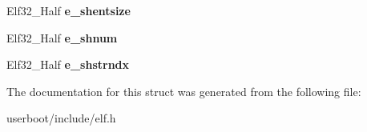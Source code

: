 \begin{DoxyCompactItemize}
\item 
Elf32\+\_\+\+Half {\bfseries e\+\_\+shentsize}\hypertarget{structElf32__Ehdr_ab53c709a841960e499da68e2316ed428}{}\label{structElf32__Ehdr_ab53c709a841960e499da68e2316ed428}

\item 
Elf32\+\_\+\+Half {\bfseries e\+\_\+shnum}\hypertarget{structElf32__Ehdr_a11249bd7e61642742a68a3e7f69ac721}{}\label{structElf32__Ehdr_a11249bd7e61642742a68a3e7f69ac721}

\item 
Elf32\+\_\+\+Half {\bfseries e\+\_\+shstrndx}\hypertarget{structElf32__Ehdr_a3b3070ccd7d971e8cb6ea58d4c6fab09}{}\label{structElf32__Ehdr_a3b3070ccd7d971e8cb6ea58d4c6fab09}

\end{DoxyCompactItemize}


The documentation for this struct was generated from the following file\+:\begin{DoxyCompactItemize}
\item 
userboot/include/elf.\+h\end{DoxyCompactItemize}
